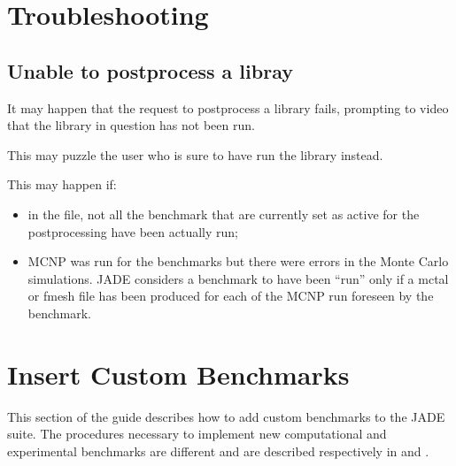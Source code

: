 \documentclass[letterpaper,10pt,english]{sphinxmanual}
\begin{document}
\chapter{Troubleshooting}
\label{\detokenize{usage/troubleshooting:troubleshooting}}\label{\detokenize{usage/troubleshooting::doc}}

\section{Unable to post\sphinxhyphen{}process a libray}
\label{\detokenize{usage/troubleshooting:unable-to-post-process-a-libray}}
\sphinxAtStartPar
It may happen that the request to post\sphinxhyphen{}process a library fails, prompting to
video that the library in question has not been run.

\noindent{}

\sphinxAtStartPar
This may puzzle the user who is sure to have run the library instead.

\sphinxAtStartPar
This may happen if:
\begin{itemize}
\item {} 
\sphinxAtStartPar
in the {\hyperref[\detokenize{usage/configuration:mainconfig}]{}} file, not all the benchmark that are currently set
as active for the post\sphinxhyphen{}processing have been actually run;

\item {} 
\sphinxAtStartPar
MCNP was run for the benchmarks but there were errors in the Monte Carlo
simulations. JADE considers a benchmark to have been “run” only if a mctal or
fmesh file has been produced for each of the MCNP run foreseen by the benchmark.

\end{itemize}


\chapter{Insert Custom Benchmarks}
\label{\detokenize{dev/insertbenchmarks:insert-custom-benchmarks}}\label{\detokenize{dev/insertbenchmarks::doc}}
\sphinxAtStartPar
This section of the guide describes how to add custom benchmarks to the JADE suite. The procedures
necessary to implement new computational and experimental benchmarks are different and are
described respectively in {\hyperref[\detokenize{dev/insertbenchmarks:customcompbench}]{}} and {\hyperref[\detokenize{dev/insertbenchmarks:customexpbench}]{}}.
\end{document}
